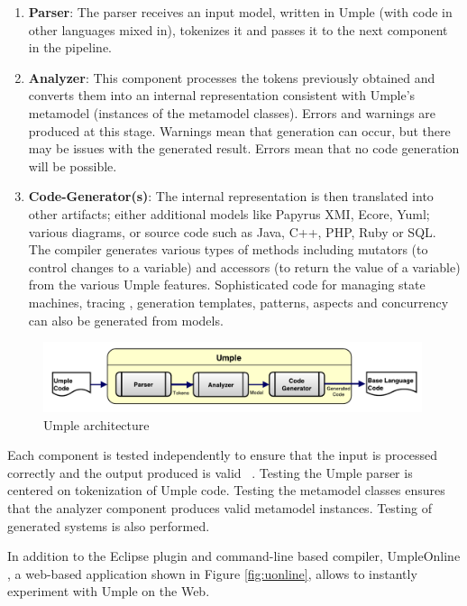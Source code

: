 \begin{enumerate}
\item \textbf{Parser}: The parser receives an input model, written in Umple (with code in other languages mixed in), tokenizes it and passes it to the next component in the pipeline.

\item \textbf{Analyzer}: This component processes the tokens previously obtained and converts them into an internal representation consistent with Umple's metamodel (instances of the metamodel classes). Errors and warnings are produced at this stage. Warnings mean that generation can occur, but there may be issues with the generated result. Errors mean that no code generation will be possible.

\item \textbf{Code-Generator(s)}: The internal representation is then translated into other artifacts; either additional models like Papyrus XMI, Ecore, Yuml; various diagrams, or source code such as Java, C++, PHP, Ruby or SQL. The compiler generates various types of methods including mutators (to control changes to a variable) and accessors (to return the value of a variable) from the various Umple features. Sophisticated code for managing state machines, tracing \cite{UmpleTracing}, generation templates, patterns, aspects and concurrency can also be generated from models.

\end{enumerate}
\begin{figure}[h]
\centering
\includegraphics[width=0.99\textwidth]{Figures/umpleArchitecture.pdf} 
\caption{Umple architecture}
\label{fig:umpleArchitecture}
\end{figure}

Each component is tested independently to ensure that the input is processed correctly and the output produced is valid ~\cite{umpleTesting2014}. Testing the Umple parser is centered on tokenization of Umple code. Testing the metamodel classes ensures that the analyzer component produces valid metamodel instances. Testing of generated systems is also performed.

In addition to the Eclipse plugin and command-line based compiler, UmpleOnline \cite{UmpleOnline}, a web-based application shown in Figure \ref{fig:uonline}, allows to instantly experiment with Umple on the Web. 

